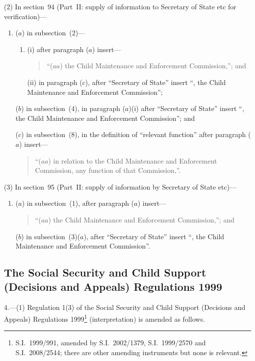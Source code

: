 \documentclass[12pt,a4paper]{article}
\begin{document}
(2) In section~94 (Part~II: supply of information to Secretary of State etc for verification)—
\begin{enumerate}\item[]
($a$) in subsection~(2)—
\begin{enumerate}\item[]
(i) after paragraph ($a$)  insert—
\begin{quotation}
“($aa$) the Child Maintenance and Enforcement Commission,”; and
\end{quotation}

(ii) in paragraph ($c$), after “Secretary of State” insert “, the Child Maintenance and Enforcement Commission”;
\end{enumerate}

($b$) in subsection~(4), in paragraph ($a$)(i)  after “Secretary of State” insert “, the Child Maintenance and Enforcement Commission”; and

($c$) in subsection~(8), in the definition of “relevant function” after paragraph ($a$)  insert—
\begin{quotation}
“($aa$) in relation to the Child Maintenance and Enforcement Commission, any function of that Commission,”.
\end{quotation}
\end{enumerate}

(3) In section~95 (Part~II: supply of information by Secretary of State etc)—
\begin{enumerate}\item[]
($a$) in subsection~(1), after paragraph ($a$)  insert—
\begin{quotation}
“($aa$) the Child Maintenance and Enforcement Commission,”; and
\end{quotation}

($b$) in subsection~(3)($a$), after “Secretary of State” insert “, the Child Maintenance and Enforcement Commission”.
\end{enumerate}

\subsection[4. The Social Security and Child Support (Decisions and Appeals) Regulations 1999]{The Social Security and Child Support (Decisions and Appeals) Regulations 1999}

4.---(1)  Regulation 1(3) of the Social Security and Child Support (Decisions and Appeals) Regulations 1999\footnote{S.I.~1999/991, amended by S.I.~2002/1379, S.I.~1999/2570 and S.I.~2008/2544; there are other amending instruments but none is relevant.} (interpretation) is amended as follows.
\end{document}
